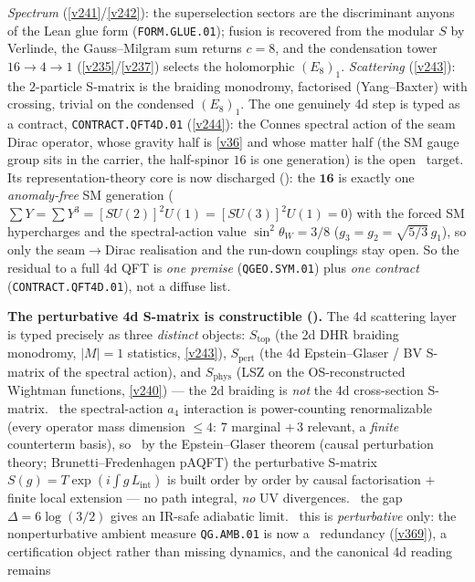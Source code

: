 \documentclass[11pt,a4paper]{article}
\begin{document}
\begin{keybox}
\emph{Spectrum} (\vref{v241}/\vref{v242}): the superselection sectors are the
discriminant anyons of the Lean glue form (\texttt{FORM.GLUE.01}); fusion is
recovered from the modular $S$ by Verlinde, the Gauss--Milgram sum returns $c=8$,
and the condensation tower $16\to4\to1$ (\vref{v235}/\vref{v237}) selects the
holomorphic $(E_8)_1$. \emph{Scattering} (\vref{v243}): the $2$-particle S-matrix is
the braiding monodromy, factorised (Yang--Baxter) with crossing, trivial on the
condensed $(E_8)_1$. The one genuinely 4d step is typed as a contract,
\texttt{CONTRACT.QFT4D.01} (\vref{v244}): the Connes spectral action of the seam
Dirac operator, whose gravity half is \vref{v36} and whose matter half (the SM
gauge group sits in the carrier, the half-spinor $16$ is one generation) is the
open \mO\ target. Its representation-theory core is now discharged
(): the $\mathbf{16}$ is exactly one
\emph{anomaly-free} SM generation ($\sum Y=\sum Y^3=[SU(2)]^2U(1)=[SU(3)]^2U(1)=0$)
with the forced SM hypercharges and the spectral-action value $\sin^2\theta_W=3/8$
($g_3=g_2=\sqrt{5/3}\,g_1$), so only the seam$\to$Dirac realisation and the
run-down couplings stay open. So the residual to a full 4d QFT is \emph{one premise}
(\texttt{QGEO.SYM.01}) plus \emph{one contract} (\texttt{CONTRACT.QFT4D.01}), not a
diffuse list.
\par\smallskip\noindent\textbf{The perturbative 4d S-matrix is constructible ().}
The 4d scattering layer is typed precisely as three \emph{distinct} objects: $S_{\mathrm{top}}$ (the 2d DHR
braiding monodromy, $|M|{=}1$ statistics, \vref{v243}), $S_{\mathrm{pert}}$ (the 4d Epstein--Glaser / BV
S-matrix of the spectral action), and $S_{\mathrm{phys}}$ (LSZ on the OS-reconstructed Wightman functions,
\vref{v240}) --- the 2d braiding is \emph{not} the 4d cross-section S-matrix. \mE\ the spectral-action $a_4$
interaction is power-counting renormalizable (every operator mass dimension $\le4$: $7$ marginal $+\,3$
relevant, a \emph{finite} counterterm basis), so \mC\ by the Epstein--Glaser theorem (causal perturbation
theory; Brunetti--Fredenhagen pAQFT) the perturbative S-matrix $S(g)=T\exp(i\!\int g\,L_{\mathrm{int}})$ is
built order by order by causal factorisation $+$ finite local extension --- no path integral, \emph{no} UV
divergences. \mC\ the gap $\Delta=6\log(3/2)$ gives an IR-safe adiabatic limit. \mC\ this is \emph{perturbative}
only: the nonperturbative ambient measure \texttt{QG.AMB.01} is now a \mC\ redundancy (\vref{v369}), a
certification object rather than missing dynamics, and the canonical 4d reading remains

\end{keybox}
\end{document}
